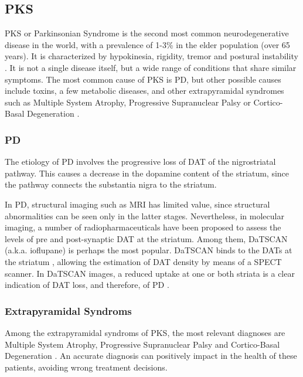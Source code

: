 \subsection{\acf{PKS}}
\acf{PKS} or Parkinsonian Syndrome is the second most common neurodegenerative disease in the world, with a prevalence of 1-3\% in the elder population (over 65 years)\cite{Eckert2007}. It is characterized by hypokinesia, rigidity, tremor and postural instability \cite{Eckert2007}. It is not a single disease itself, but a wide range of conditions that share similar symptoms. The most common cause of \ac{PKS} is \acf{PD}, but other possible causes include toxins, a few metabolic diseases, and other extrapyramidal syndromes such as Multiple System Atrophy, Progressive Supranuclear Palsy or Cortico-Basal Degeneration \cite{Christine2004,tatsch2008extrapyramidal}. 

\subsubsection{\acf{PD}}
The etiology of \acf{PD} involves the progressive loss of \acf{DAT} of the nigrostriatal pathway. This causes a decrease in the dopamine content of the striatum, since the pathway connects the substantia nigra to the striatum. 

In \ac{PD}, structural imaging such as \ac{MRI} has limited value, since structural abnormalities can be seen only in the latter stages. Nevertheless, in molecular imaging, a number of radiopharmaceuticals have been proposed to assess the levels of pre and post-synaptic \ac{DAT} at the striatum. Among them, DaTSCAN (a.k.a. ioflupane) is perhaps the most popular. DaTSCAN binds to the \acp{DAT} at the striatum \cite{Winogrodzka2003,PunalRioboo2007,Eckert2007}, allowing the estimation of \ac{DAT} density by means of a \ac{SPECT} scanner. In DaTSCAN images, a reduced uptake at one or both striata is a clear indication of \ac{DAT} loss, and therefore, of \ac{PD} \cite{PunalRioboo2007}.
  
\subsubsection{Extrapyramidal Syndroms}
Among the extrapyramidal syndroms of \ac{PKS}, the most relevant diagnoses are Multiple System Atrophy, Progressive Supranuclear Palsy and Cortico-Basal Degeneration \cite{tatsch2008extrapyramidal}. An accurate diagnosis can positively impact in the health of these patients, avoiding wrong treatment decisions. 

